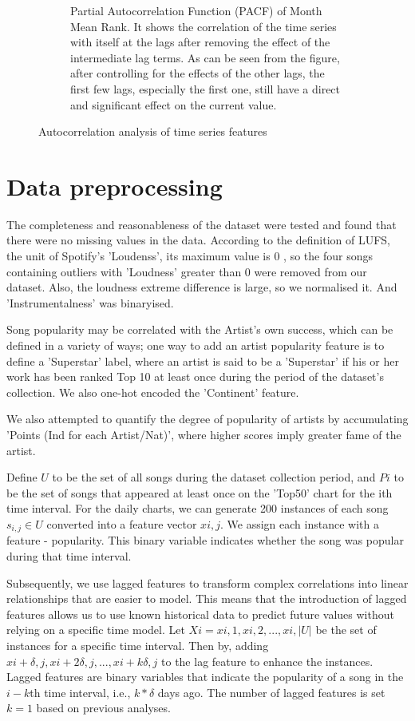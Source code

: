 \documentclass{article}
\begin{document}
\begin{figure}[ht]
\begin{subfigure}[t]{0.45\textwidth}
    \captionsetup{labelformat=default}
    \caption{Partial Autocorrelation Function (PACF) of Month Mean Rank. It shows the correlation of the time series with itself at the lags after removing the effect of the intermediate lag terms. As can be seen from the figure, after controlling for the effects of the other lags, the first few lags, especially the first one, still have a direct and significant effect on the current value.}
    \label{fig:pacf}
  \end{subfigure}
  \caption{Autocorrelation analysis of time series features}
  \label{aat}
\end{figure}
\section{Data preprocessing}
The completeness and reasonableness of the dataset were tested and found that there were no missing values in the data. According to the definition of LUFS, the unit of Spotify's 'Loudenss', its maximum value is 0 \cite{lloudness}, so the four songs containing outliers with 'Loudness' greater than 0 were removed from our dataset. Also, the loudness extreme difference is large, so we normalised it. And 'Instrumentalness' was binaryised.

Song popularity may be correlated with the Artist's own success, which can be defined in a variety of ways; one way to add an artist popularity feature is to define a 'Superstar' label\cite{Interiano2018MusicalTA}, where an artist is said to be a 'Superstar' if his or her work has been ranked Top 10 at least once during the period of the dataset's collection. We also one-hot encoded the 'Continent' feature.

We also attempted to quantify the degree of popularity of artists by accumulating 'Points (Ind for each Artist/Nat)', where higher scores imply greater fame of the artist.

Define $U$ to be the set of all songs during the dataset collection period, and $Pi$ to be the set of songs that appeared at least once on the 'Top50' chart for the ith time interval. For the daily charts, we can generate 200 instances of each song $s_{i,j} \in U$ converted into a feature vector $xi,j$. We assign each instance with a feature - popularity. This binary variable indicates whether the song was popular during that time interval.

Subsequently, we use lagged features to transform complex correlations into linear relationships that are easier to model. This means that the introduction of lagged features allows us to use known historical data to predict future values without relying on a specific time model. Let $Xi = {xi,1, xi,2, ... , xi, |U|}$ be the set of instances for a specific time interval. Then by, adding $xi+\delta,j, xi+2\delta,j, ... , xi+k\delta,j$ to the lag feature to enhance the instances\cite{8999039}. Lagged features are binary variables that indicate the popularity of a song in the $i-k$th time interval, i.e., $k*\delta$ days ago. The number of lagged features is set $k = 1$ based on previous analyses.
\end{document}
